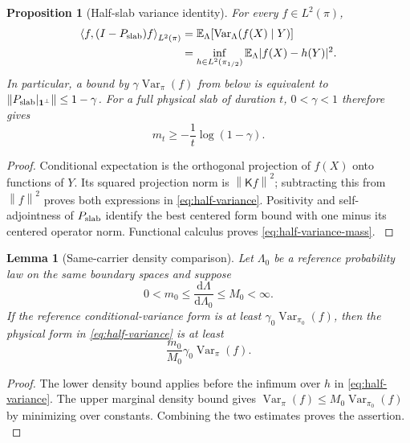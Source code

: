 \documentclass[11pt,oneside,openany]{book}
\newtheorem{proposition}[proposition]{Proposition}
\newtheorem{lemma}[lemma]{Lemma}
\theoremstyle{definition}
\theoremstyle{remark}
\newcommand{\E}{\mathbb E}
\newcommand{\one}{\mathbf1}
\newcommand{\dd}{\mathrm d}
\newcommand{\Var}{\operatorname{Var}}
\newcommand{\norm}[1]{\left\lVert#1\right\rVert}
\newcommand{\ip}[2]{\left\langle#1,#2\right\rangle}
\newcommand{\src}[2]{\cite[#2]{#1}}
\begin{document}
\begin{proposition}[Half-slab variance identity]
\label{prop:half-variance}
For every $f\in L^2(\pi)$,
\begin{equation}\label{eq:half-variance}
\begin{aligned}
\ip{f}{(I-P_{\rm slab})f}_{L^2(\pi)}
&=\E_\Lambda\!\left[\Var_\Lambda(f(X)\mid Y)\right]\\
&=\inf_{h\in L^2(\pi_{1/2})}
  \E_\Lambda|f(X)-h(Y)|^2.
\end{aligned}
\end{equation}
In particular, a bound by $\gamma\Var_\pi(f)$ from below is equivalent
to $\norm{P_{\rm slab}|_{\one^\perp}}\le1-\gamma$. For a full physical
slab of duration $t$, $0<\gamma<1$ therefore gives
\begin{equation}\label{eq:half-variance-mass}
 m_t\ge-\frac1t\log(1-\gamma).
\end{equation}
\end{proposition}
\begin{proof}
Conditional expectation is the orthogonal projection of $f(X)$ onto
functions of $Y$. Its squared projection norm is $\norm{\mathsf Kf}^2$;
subtracting this from $\norm f^2$ proves both expressions in
\cref{eq:half-variance}. Positivity and self-adjointness of
$P_{\rm slab}$ identify the best centered form bound with one minus
its centered operator norm. Functional calculus proves
\cref{eq:half-variance-mass}. \src{F6}{V58}
\end{proof}

\begin{lemma}[Same-carrier density comparison]
\label{lem:half-density-comparison}
Let $\Lambda_0$ be a reference probability law on the same boundary
spaces and suppose
\[
0<m_0\le\frac{\dd\Lambda}{\dd\Lambda_0}\le M_0<\infty.
\]
If the reference conditional-variance form is at least
$\gamma_0\Var_{\pi_0}(f)$, then the physical form in
\cref{eq:half-variance} is at least
\begin{equation}\label{eq:half-density-comparison}
\frac{m_0}{M_0}\gamma_0\Var_\pi(f).
\end{equation}
\end{lemma}
\begin{proof}
The lower density bound applies before the infimum over $h$ in
\cref{eq:half-variance}. The upper marginal density bound gives
$\Var_\pi(f)\le M_0\Var_{\pi_0}(f)$ by minimizing over constants.
Combining the two estimates proves the assertion. \src{F6}{V58}
\end{proof}
\end{document}
